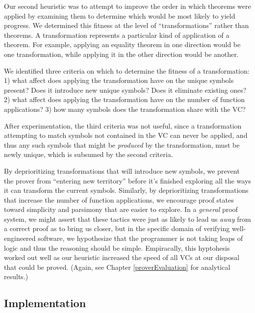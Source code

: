 Our second heuristic was to attempt to improve the order in which theorems were applied by examining them to determine which would be most likely to yield progress.  We determined this fitness at the level of ``transformations'' rather than theorems.  A transformation represents a particular kind of application of a theorem.  For example, applying an equality theorem in one direction would be one transformation, while applying it in the other direction would be another.

We identified three criteria on which to determine the fitness of a transformation: 1) what affect does applying the transformation have on the unique symbols present?  Does it introduce new unique symbols?  Does it eliminate existing ones? 2) what affect does applying the transformation have on the number of function applications? 3) how many symbols does the transformation share with the VC?

After experimentation, the third criteria was not useful, since a transformation attempting to match symbols not contained in the VC can never be applied, and thus any such symbols that might be \emph{produced} by the transformation, must be newly unique, which is subsumed by the second criteria.

By deprioritizing transformations that will introduce new symbols, we prevent the prover from ``entering new territory'' before it's finished exploring all the ways it can transform the current symbols.  Similarly, by deprioritizing transformations that increase the number of function applications, we encourage proof states toward simplicity and parsimony that are easier to explore.  In a \emph{general} proof system, we might assert that these tactics were just as likely to lead us \emph{away} from a correct proof as to bring us closer, but in the specific domain of verifying well-engineered software, we hypothesize that the programmer is not taking leaps of logic and thus the reasoning should be simple.  Empiracally, this hyptohesis worked out well as our heuristic increased the speed of all VCs at our disposal that could be proved.  (Again, see Chapter \ref{proverEvaluation} for analytical results.)

	\subsection{Implementation}

